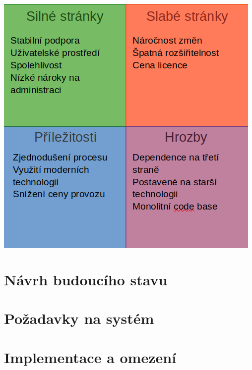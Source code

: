 \documentclass{article}
\begin{document}
\begin{sloppypar}
\begin{spacing}{1.15}
        \begin{center}
            \label{SWOT Analýza}
            \includegraphics[scale=0.5]{221129-PIS1-SWOT.png}
        \end{center}

        \section*{Návrh budoucího stavu}
        
        \section*{Požadavky na systém}
        
        \section*{Implementace a omezení}
		
        	
	\end{spacing}
    \end{sloppypar}
\end{document}
